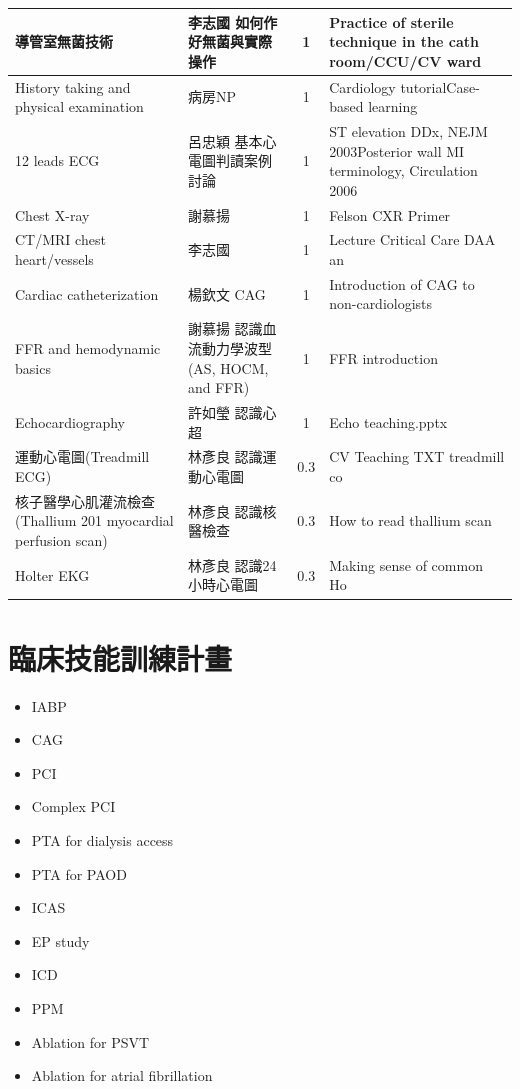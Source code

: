 \documentclass[12pt,a4paper]{article}
\begin{document}
\begin{longtable}{p{4cm}p{5cm}cp{5cm}}
\hline
導管室無菌技術 & 李志國 \newline 如何作好無菌與實際操作 & 1 & Practice of sterile technique in the cath room/CCU/CV ward \\
\hline
History taking and physical examination & 病房NP & 1 & Cardiology tutorial\newline Case-based learning \\
\hline
12 leads ECG & 呂忠穎 \newline 基本心電圖判讀案例討論 & 1 & ST elevation DDx, NEJM 2003\newline Posterior wall MI terminology, Circulation 2006 \\
\hline
Chest X-ray & 謝慕揚 & 1 & Felson CXR Primer \\
\hline
CT/MRI chest heart/vessels & 李志國 & 1 & Lecture Critical Care DAA an \\
\hline
Cardiac catheterization & 楊欽文 \newline CAG & 1 & Introduction of CAG to non-cardiologists \\
\hline
FFR and hemodynamic basics & 謝慕揚 \newline 認識血流動力學波型 (AS, HOCM, and FFR) & 1 & FFR introduction \\
\hline
Echocardiography & 許如瑩 \newline 認識心超 & 1 & Echo teaching.pptx \\
\hline
運動心電圖(Treadmill ECG) & 林彥良 \newline 認識運動心電圖 & 0.3 & CV Teaching TXT treadmill co \\
\hline
核子醫學心肌灌流檢查(Thallium 201 myocardial perfusion scan) & 林彥良 \newline 認識核醫檢查 & 0.3 & How to read thallium scan \\
\hline
Holter EKG & 林彥良 \newline 認識24小時心電圖 & 0.3 & Making sense of common Ho \\
\hline
\end{longtable}

\section{臨床技能訓練計畫}
\begin{itemize}
    \item IABP
    \item CAG
    \item PCI
    \item Complex PCI
    \item PTA for dialysis access
    \item PTA for PAOD
    \item ICAS
    \item EP study
    \item ICD
    \item PPM
    \item Ablation for PSVT
    \item Ablation for atrial fibrillation
\end{itemize}
\end{document}
